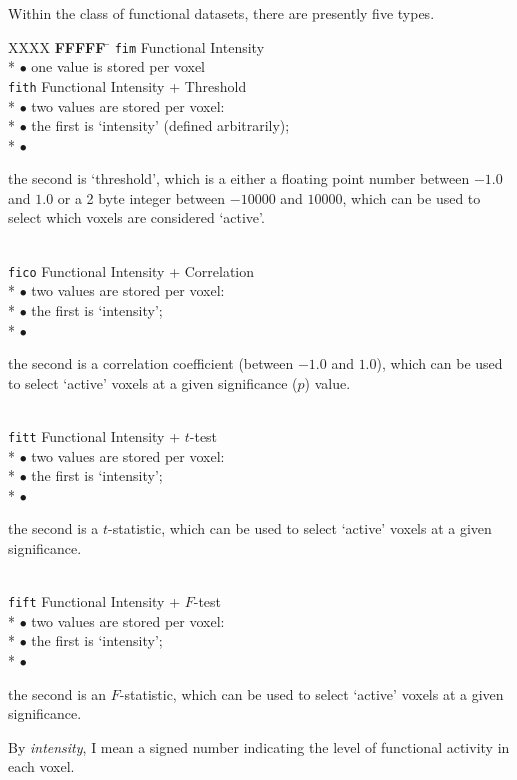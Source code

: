 Within the class of functional datasets, there are presently
five types.
\begin{tabbing}
   XXXX \= {\bf FFFFF} \= \kill
        \> {\tt fim}   \> Functional Intensity \\*
        \>             \> $\bullet$ one value is stored per voxel \\[1ex]
%
        \> {\tt fith}  \> Functional Intensity + Threshold\\*
        \>             \> $\bullet$ two values are stored per voxel: \\*
        \>             \> $\bullet$ the first is `intensity' (defined arbitrarily); \\*
        \>             \> $\bullet$ \parbox[t]{4.5in}{
                              the second is `threshold',
                              which is a either a floating point number between $-1.0$ and $1.0$
                              or a 2 byte integer between $-10000$ and $10000$,
                              which can be used to select which
                              voxels are considered `active'.} \\[1ex]
%
        \> {\tt fico}  \> Functional Intensity + Correlation\\*
        \>             \> $\bullet$ two values are stored per voxel:\\*
        \>             \> $\bullet$ the first is `intensity'; \\*
        \>             \> $\bullet$ \parbox[t]{4.5in}{
                              the second is a correlation coefficient
                              (between $-1.0$ and $1.0$),
                              which can be used to select `active' voxels
                              at a given significance ($p$) value.}\\[1ex]
%
        \> {\tt fitt} \> Functional Intensity + $t$-test\\*
        \>             \> $\bullet$ two values are stored per voxel:\\*
        \>             \> $\bullet$ the first is `intensity'; \\*
        \>             \> $\bullet$ \parbox[t]{4.5in}{
                              the second is a $t$-statistic, which
                              can be used to select `active' voxels
                              at a given significance.}\\[1ex]
%
        \> {\tt fift} \> Functional Intensity + $F$-test\\*
        \>             \> $\bullet$ two values are stored per voxel:\\*
        \>             \> $\bullet$ the first is `intensity'; \\*
        \>             \> $\bullet$ \parbox[t]{4.5in}{
                              the second is an $F$-statistic, which
                              can be used to select `active' voxels
                              at a given significance.}
\end{tabbing}
By {\it intensity}, I mean a signed
number indicating the level of functional activity in each voxel.

